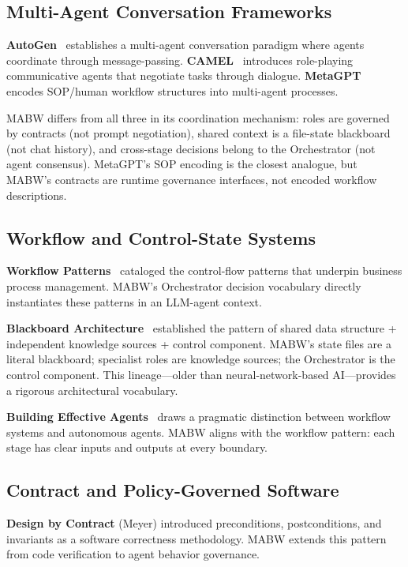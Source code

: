 \documentclass[11pt,a4paper]{article}
\begin{document}
\subsection{Multi-Agent Conversation Frameworks}

\textbf{AutoGen}~\cite{wu2023autogen} establishes a multi-agent conversation paradigm where agents coordinate through message-passing. \textbf{CAMEL}~\cite{li2023camel} introduces role-playing communicative agents that negotiate tasks through dialogue. \textbf{MetaGPT}~\cite{hong2023metagpt} encodes SOP/human workflow structures into multi-agent processes.

MABW differs from all three in its coordination mechanism: roles are governed by contracts (not prompt negotiation), shared context is a file-state blackboard (not chat history), and cross-stage decisions belong to the Orchestrator (not agent consensus). MetaGPT's SOP encoding is the closest analogue, but MABW's contracts are runtime governance interfaces, not encoded workflow descriptions.

\subsection{Workflow and Control-State Systems}

\textbf{Workflow Patterns}~\cite{vanderaalst2003} cataloged the control-flow patterns that underpin business process management. MABW's Orchestrator decision vocabulary directly instantiates these patterns in an LLM-agent context.

\textbf{Blackboard Architecture}~\cite{nii1986} established the pattern of shared data structure + independent knowledge sources + control component. MABW's state files are a literal blackboard; specialist roles are knowledge sources; the Orchestrator is the control component. This lineage---older than neural-network-based AI---provides a rigorous architectural vocabulary.

\textbf{Building Effective Agents}~\cite{anthropic2024agents} draws a pragmatic distinction between workflow systems and autonomous agents. MABW aligns with the workflow pattern: each stage has clear inputs and outputs at every boundary.

\subsection{Contract and Policy-Governed Software}

\textbf{Design by Contract} (Meyer) introduced preconditions, postconditions, and invariants as a software correctness methodology. MABW extends this pattern from code verification to agent behavior governance.
\end{document}
